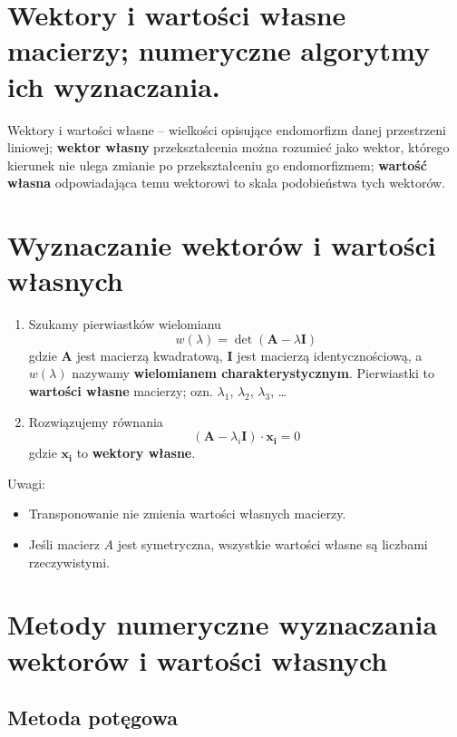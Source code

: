 \section{Wektory i wartości własne macierzy; numeryczne algorytmy ich wyznaczania.}

Wektory i wartości własne – wielkości opisujące endomorfizm danej przestrzeni liniowej;
\textbf{wektor własny} przekształcenia można rozumieć jako wektor,
którego kierunek nie ulega zmianie po przekształceniu go endomorfizmem;
\textbf{wartość własna} odpowiadająca temu wektorowi to skala podobieństwa tych wektorów.

\section{Wyznaczanie wektorów i wartości własnych}

\begin{enumerate}[itemsep=0pt,partopsep=0pt, parsep=0pt]
    \item Szukamy pierwiastków wielomianu
    \[
        w(\lambda)=\det(\mathbf{A}-\lambda\mathbf{I})
    \]
    gdzie $\mathbf{A}$ jest macierzą kwadratową, $\mathbf{I}$ jest macierzą identycznościową,
    a $w(\lambda)$ nazywamy \textbf{wielomianem charakterystycznym}.
    Pierwiastki to \textbf{wartości własne} macierzy; ozn. $\lambda_1$, $\lambda_2$, $\lambda_3$, \ldots
    \item Rozwiązujemy równania
    \[
        (\mathbf{A}-\lambda_i\mathbf{I})\cdot\mathbf{x_i}=0
    \]
    gdzie $\mathbf{x_i}$ to \textbf{wektory własne}.
\end{enumerate}

Uwagi:
\begin{itemize}[itemsep=0pt,partopsep=0pt, parsep=0pt]
    \item Transponowanie nie zmienia wartości własnych macierzy.
    \item Jeśli macierz $A$ jest symetryczna, wszystkie wartości własne są liczbami rzeczywistymi.
\end{itemize}

\section{Metody numeryczne wyznaczania wektorów i wartości własnych}

\subsection{Metoda potęgowa}


